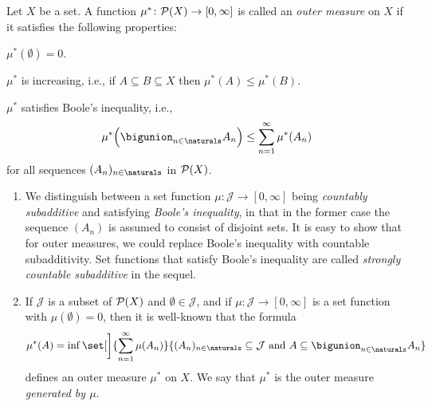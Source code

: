 \documentclass[article, a4paper, 11pt, oneside]{memoir}
\numberwithin{equation}{chapter}
\newcommand{\calJ}{\mathcal{J}}
\begin{document}
\begin{definition}
    Let $X$ be a set. A function $\mu^* \colon \mathcal{P}(X) \to [0,\infty]$ is called an \emph{outer measure} on $X$ if it satisfies the following properties:
    \begin{enumdef}
        \item $\mu^*(\emptyset) = 0$.
        \item $\mu^*$ is increasing, i.e., if $A \subseteq B \subseteq X$ then $\mu^*(A) \leq \mu^*(B)$.
        \item $\mu^*$ satisfies Boole's inequality, i.e.,
        \begin{equation*}
            \mu^* \Bigl( \bigunion_{n \in \naturals} A_n \Bigr)
                \leq \sum_{n=1}^\infty \mu^*(A_n)
        \end{equation*}
        for all sequences $(A_n)_{n \in \naturals}$ in $\mathcal{P}(X)$.
    \end{enumdef}
\end{definition}

\begin{remarkbreak}
\begin{enumerate}
    \item We distinguish between a set function $\mu \colon \calJ \to [0,\infty]$ being \emph{countably subadditive} and satisfying \emph{Boole's inequality}, in that in the former case the sequence $(A_n)$ is assumed to consist of disjoint sets. It is easy to show that for outer measures, we could replace Boole's inequality with countable subadditivity. Set functions that satisfy Boole's inequality are called \emph{strongly countable subadditive} in the sequel.

    \item If $\calJ$ is a subset of $\mathcal{P}(X)$ and $\emptyset \in \calJ$, and if $\mu \colon \calJ \to [0,\infty]$ is a set function with $\mu(\emptyset) = 0$, then it is well-known that the formula
    \begin{equation*}
        \mu^*(A)
            = \inf \set[\bigg]{ \sum_{n=1}^\infty \mu(A_n)}{ (A_n)_{n \in \naturals} \subseteq \calJ \text{ and } A \subseteq \bigunion_{n \in \naturals} A_n }
    \end{equation*}
    defines an outer measure $\mu^*$ on $X$. We say that $\mu^*$ is the outer measure \emph{generated by $\mu$}.
\end{enumerate}
\end{remarkbreak}
\end{document}
